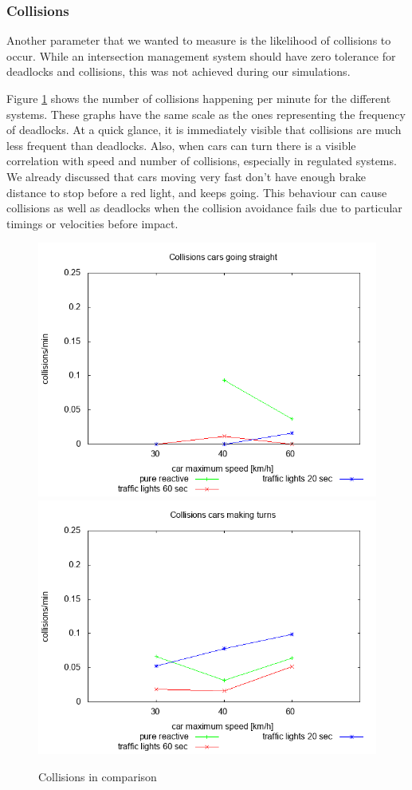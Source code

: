 \subsubsection{Collisions}
Another parameter that we wanted to measure is the likelihood of collisions to occur.
While an intersection management system should have zero tolerance for deadlocks and collisions, this was not achieved during our simulations.

Figure \ref{fig:collisions} shows the number of collisions happening per minute for the different systems.
These graphs have the same scale as the ones representing the frequency of deadlocks.
At a quick glance, it is immediately visible that collisions are much less frequent than deadlocks.
Also, when cars can turn there is a visible correlation with speed and number of collisions, especially in regulated systems.
We already discussed that cars moving very fast don't have enough brake distance to stop before a red light, and keeps going.
This behaviour can cause collisions as well as deadlocks when the collision avoidance fails due to particular timings or velocities before impact.


\begin{figure}
\centering
\includegraphics[scale=0.35]{img/plot_collisionsstraight}
\includegraphics[scale=0.35]{img/plot_collisionsturns}
\caption{Collisions in comparison}
\label{fig:collisions}
\end{figure}




